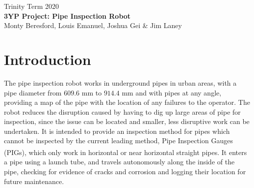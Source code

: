 \documentclass[11pt]{article}		%
\begin{document}
	
	\flushleft
	\raggedright

	\begin{center}
		\vspace*{2cm}
		Trinity Term 2020\\ %
		\vspace*{6cm}
		\huge{\textbf{3YP Project: Pipe Inspection Robot}}\\ 
		\vspace*{6cm}
		\large{Monty Beresford, Louis Emanuel, Joshua Gei \& Jim Laney} %
		\thispagestyle{empty} %
	\end{center}

	\newpage
	
	\tableofcontents
	\thispagestyle{empty} %
	\newpage

	\setcounter{page}{1}
	
	\section{Introduction}
	
	The pipe inspection robot works in underground pipes in urban areas, with a pipe diameter from $609.6$ mm to $914.4$ mm and with pipes at any angle, providing a map of the pipe with the location of any failures to the operator. %
	The robot reduces the disruption caused by having to dig up large areas of pipe for inspection, since the issue can be located and smaller, less disruptive work can be undertaken.
	It is intended to provide an inspection method for pipes which cannot be inspected by the current leading method, Pipe Inspection Gauges (PIGs), which only work in horizontal or near horizontal straight pipes\textsuperscript{\cite{mills2017advances}}.
	It enters a pipe using a launch tube, and travels autonomously along the inside of the pipe, checking for evidence of cracks and corrosion and logging their location for future maintenance.
	\\
	
\end{document}
